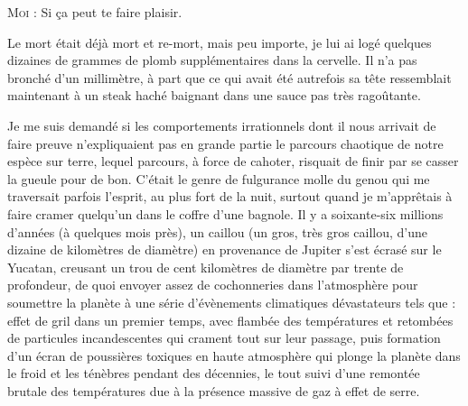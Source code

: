 \textsc{Moi} : Si ça peut te faire plaisir.

Le mort était déjà mort et re-mort, mais peu importe, je lui ai logé quelques dizaines de grammes de plomb supplémentaires dans la cervelle. Il n’a pas bronché d’un millimètre, à part que ce qui avait été autrefois sa tête ressemblait maintenant à un steak haché baignant dans une sauce pas très ragoûtante.

\label{rat:14}%
Je me suis demandé si les comportements irrationnels dont il nous arrivait de faire preuve n’expliquaient pas en grande partie le parcours chaotique de notre espèce sur terre, lequel parcours, à force de cahoter, risquait de finir par se casser la gueule pour de bon. C’était le genre de fulgurance molle du genou qui me traversait parfois l’esprit, au plus fort de la nuit, surtout quand je m’apprêtais à faire cramer quelqu’un dans le coffre d’une bagnole. Il y a soixante-six millions d’années (à quelques mois près), un caillou (un gros, très gros caillou, d’une dizaine de kilomètres de diamètre) en provenance de Jupiter s’est écrasé sur le Yucatan, creusant un trou de cent kilomètres de diamètre par trente de profondeur, de quoi envoyer assez de cochonneries dans l’atmosphère pour soumettre la planète à une série d’évènements climatiques dévastateurs tels que : effet de gril dans un premier temps, avec flambée des températures et retombées de particules incandescentes qui crament tout sur leur passage, puis formation d’un écran de poussières toxiques en haute atmosphère qui plonge la planète dans le froid et les ténèbres pendant des décennies, le tout suivi d’une remontée brutale des températures due à la présence massive de gaz à effet de serre.

